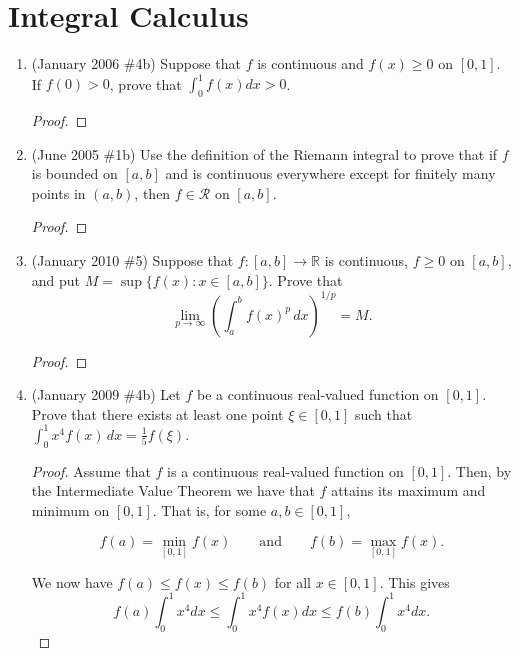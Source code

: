 \documentclass[reqno]{article}
\theoremstyle{remark}
\numberwithin{equation}{section}
\newcommand{\R}{\mathbb{R}}
\newcommand{\SR}{\mathscr{R}}
\begin{document}
\section{Integral Calculus}

\begin{enumerate} 

	\item (January 2006 \#4b) Suppose that $f$ is continuous and $f(x)\geq 0$ on $[0,1]$. If $f(0)>0$, prove that $\int_0^1 f(x)dx>0$.
	
	\begin{proof}
    
    \end{proof}
	
	\item (June 2005 \#1b) Use the definition of the Riemann integral to prove that if $f$ is bounded on $[a,b]$ and is continuous everywhere except for finitely many points in $(a,b)$, then $f\in\SR$ on $[a,b]$.
	
	\begin{proof}
    
    \end{proof}
	
	\item (January 2010 \#5) Suppose that $f:[a,b]\to\R$ is continuous, $f\geq 0$ on $[a,b]$, and put $M=\sup\{f(x):x\in[a,b]\}$. Prove that $$\lim_{p\to\infty}\left(\int_a^b f(x)^p\,dx\right)^{1/p}=M.$$
	
	\begin{proof}
    
    \end{proof}
		
	\item (January 2009 \#4b) Let $f$ be a continuous real-valued function on $[0,1]$. Prove that there exists at least one point $\xi\in[0,1]$ such that $\int_0^1 x^4 f(x)\,dx=\frac{1}{5}f(\xi)$.
	
	\begin{proof}
    Assume that $f$ is a continuous real-valued function on $[0,1]$. Then, by the Intermediate Value Theorem we have that $f$ attains its maximum and minimum on $[0,1]$. That is, for some $a,b\in[0,1]$, 
    
    $$f(a)=\min\limits_{[0,1]}f(x) \qquad \text{and} \qquad  f(b)=\max\limits_{[0,1]}f(x).$$
    
    We now have $f(a)\leq f(x)\leq f(b)$ for all $x\in[0,1]$. This gives 
    $$f(a)\int_0^1 x^4dx\leq \int_0^1 x^4f(x)dx\leq f(b)\int_0^1 x^4dx.$$
    

\end{proof}
\end{enumerate}
\end{document}
